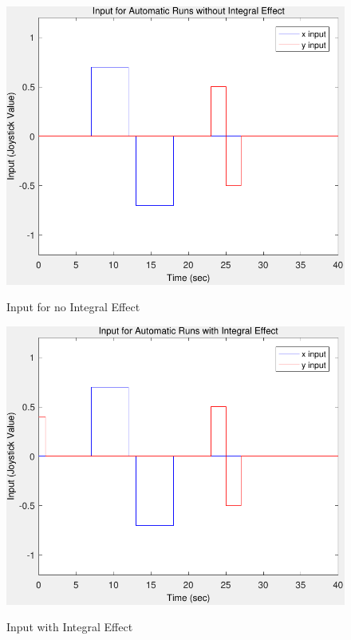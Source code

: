 \begin{figure}
\caption{Input for no Integral Effect}
	\centering
		\includegraphics[scale =0.6]{images/input_noIntegralEffect.pdf}
	\label{fig:Input_noIntegralEffect}
\end{figure}

\begin{figure}
\caption{Input with Integral Effect}
	\centering
		\includegraphics[scale =0.6]{images/input_IntegralEffect.pdf}
	\label{fig:Input_IntegralEffect}
\end{figure}
